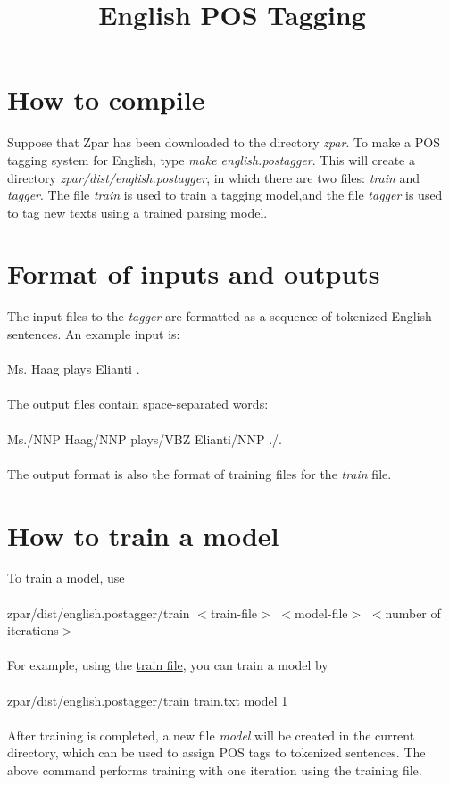 \documentclass[12pt]{article}
\title{English POS Tagging}
\begin{document}
\begin{CJK}{GBK}{song}
\maketitle

\section{How to compile}
Suppose that Zpar has been downloaded to the directory \textit{zpar}. To make a POS tagging system for English, type \textit{make english.postagger}. This will create a directory \textit{zpar/dist/english.postagger}, in which there are two files: \textit{train} and \textit{tagger}. The file \textit{train} is used to train a tagging model,and the file \textit{tagger} is used to tag new texts using a trained parsing model. 
\section{Format of inputs and outputs}
The input files to the \textit{tagger} are formatted as a sequence of tokenized English sentences. An example input is:
\\
\\
\hspace{3cm} Ms. Haag plays Elianti .
\\
\\
The output files contain space-separated words:
\\
\\
\hspace{3cm} Ms./NNP Haag/NNP plays/VBZ Elianti/NNP ./.
\\
\\
The output format is also the format of training files for the \textit{train} file.
\section{How to train a model}
To train a model, use
\\
\\
\hspace{3cm} zpar/dist/english.postagger/train $<$train-file$>$ $<$model-file$>$ $<$number of iterations$>$ \\
\\
For example, using the \href{eng_pos_files/train.txt}{train file}, you can train a  model by
\\
\\
\hspace{3cm} zpar/dist/english.postagger/train train.txt model 1 \\
\\
After training is completed, a new file \textit{model} will be created in the current directory, which can be used to assign POS tags to tokenized sentences. The above command performs training with one iteration using the training file. 

\end{CJK}
\end{document}
